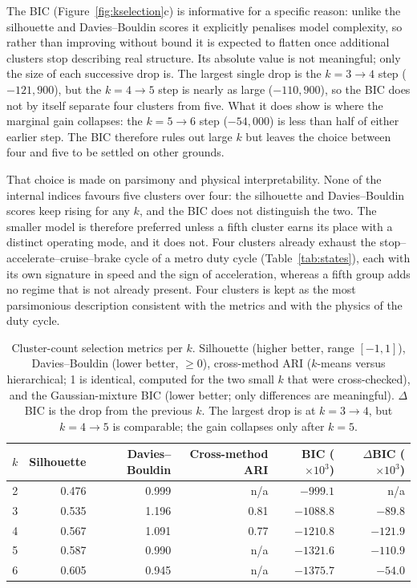 The BIC (Figure~\ref{fig:kselection}c) is informative for a specific reason: unlike the
silhouette and Davies--Bouldin scores it explicitly penalises model complexity, so rather than
improving without bound it is expected to flatten once additional clusters stop describing real
structure. Its absolute value is not meaningful; only the size of each successive drop is. The
largest single drop is the $k=3\rightarrow4$ step ($-121{,}900$), but the $k=4\rightarrow5$ step
is nearly as large ($-110{,}900$), so the BIC does not by itself separate four clusters from
five. What it does show is where the marginal gain collapses: the $k=5\rightarrow6$ step
($-54{,}000$) is less than half of either earlier step. The BIC therefore rules out large $k$
but leaves the choice between four and five to be settled on other grounds.

That choice is made on parsimony and physical interpretability. None of the internal indices
favours five clusters over four: the silhouette and Davies--Bouldin scores keep rising for any
$k$, and the BIC does not distinguish the two. The smaller model is therefore preferred unless
a fifth cluster earns its place with a distinct operating mode, and it does not. Four clusters
already exhaust the stop--accelerate--cruise--brake cycle of a metro duty cycle
(Table~\ref{tab:states}), each with its own signature in speed and the sign of acceleration,
whereas a fifth group adds no regime that is not already present. Four clusters is kept as the
most parsimonious description consistent with the metrics and with the physics of the duty
cycle.

\begin{table}[htbp]
  \centering
  \caption{Cluster-count selection metrics per $k$. Silhouette (higher better, range
  $[-1,1]$), Davies--Bouldin (lower better, $\geq 0$), cross-method ARI ($k$-means versus
  hierarchical; 1 is identical, computed for the two small $k$ that were cross-checked), and the
  Gaussian-mixture BIC (lower better; only differences are meaningful). $\Delta$BIC is the drop
  from the previous $k$. The largest drop is at $k=3\rightarrow4$, but $k=4\rightarrow5$ is
  comparable; the gain collapses only after $k=5$.}
  \label{tab:kselection}
  \begin{tabular}{rrrrrr}
    \toprule
    $k$ & Silhouette & Davies--Bouldin & Cross-method ARI & BIC ($\times 10^{3}$) & $\Delta$BIC ($\times 10^{3}$) \\
    \midrule
    2 & 0.476 & 0.999 & n/a  & $-999.1$  & n/a      \\
    3 & 0.535 & 1.196 & 0.81 & $-1088.8$ & $-89.8$  \\
    4 & 0.567 & 1.091 & 0.77 & $-1210.8$ & $-121.9$ \\
    5 & 0.587 & 0.990 & n/a  & $-1321.6$ & $-110.9$ \\
    6 & 0.605 & 0.945 & n/a  & $-1375.7$ & $-54.0$  \\
    \bottomrule
  \end{tabular}
\end{table}

